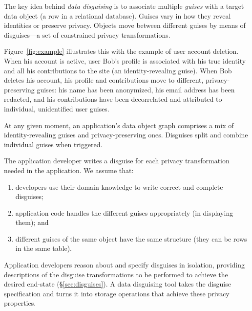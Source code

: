 %
The key idea behind \emph{data disguising} is to associate multiple \emph{guises} with a target data
object (\ie a row in a relational database). Guises vary in how they reveal identities or preserve privacy.
%
Objects move between different guises by means of disguises---a set of constrained privacy
transformations.

Figure~\ref{fig:example} illustrates this with the example of user account deletion.
%
When his account is active, user Bob's profile is associated with his true identity and all his
contributions to the site (an identity-revealing guise).
%
When Bob deletes his account, his profile and contributions move to different, privacy-preserving
guises: his name has been anonymized, his email address has been redacted, and his contributions
have been decorrelated and attributed to individual, unidentified user guises.
%

%
%
At any given moment, an application's data object graph comprises a mix of identity-revealing guises
and privacy-preserving ones. Disguises split and combine individual guises when triggered.

%
The application developer writes a disguise for each privacy transformation needed
in the application.
%
%
We assume that:
\begin{enumerate}[nosep]
  \item developers use their domain knowledge to write correct and complete disguises;
  \item application code handles the different guises appropriately (\eg in
    displaying them); and
  \item different guises of the same object have the same structure (\eg they can be
    rows in the same table).
\end{enumerate}
%
Application developers reason about and specify disguises in isolation, providing descriptions of
the disguise transformations to be performed to achieve the desired end-state (\S\ref{sec:disguises}).
A data disguising tool takes the disguise specification and turns it into storage operations that
achieve these privacy properties.

